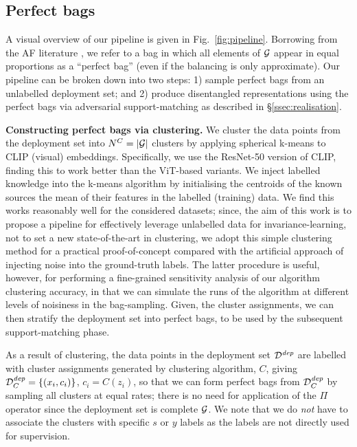 %
\subsection{Perfect bags}\label{sec:implementation}
%
A visual overview of our pipeline is given in Fig.~\ref{fig:pipeline}. 
%
Borrowing from the \ac{AF} literature \citep{chouldechova17,KleMulRag16}, we refer to a bag in
which all elements of ${\mathcal{G}}$ appear in equal proportions as a ``perfect bag'' (even if the balancing
is only approximate). 
%
Our pipeline can be broken down into two steps: 1) sample perfect bags from an unlabelled
deployment set; and 2) produce disentangled representations using the perfect bags via adversarial
support-matching as described in \S\ref{ssec:realisation}.

\textbf{Constructing perfect bags via clustering.}
%
We cluster the data points from the deployment set into \( N^C=|{\mathcal{G}}| \) clusters by applying
spherical k-means to CLIP \cite{radford2021learning} (visual) embeddings. 
%
Specifically, we use the ResNet-50 version of CLIP, finding this to work better than the ViT-based
variants. 
%
We inject labelled knowledge into the k-means algorithm by initialising the centroids of the known
sources the mean of their features in the labelled (training) data. 
%
We find this works reasonably well for the considered datasets; since, the aim of this work is to
propose a pipeline for effectively leverage unlabelled data for invariance-learning, not to set a
new state-of-the-art in clustering, we adopt this simple clustering method for a practical
proof-of-concept compared with the artificial approach of injecting noise into the ground-truth
labels. 
%
The latter procedure is useful, however, for performing a fine-grained sensitivity analysis of our
algorithm \wrt{} clustering accuracy, in that we can simulate the runs of the algorithm at
different levels of noisiness in the bag-sampling. 
%
%
Given, the cluster assignments, we can then stratify the deployment set into perfect bags, to be
used by the subsequent support-matching phase.

As a result of clustering, the data points in the deployment set \( {\mathcal{D}}^\mathit{dep} \) are
labelled with cluster assignments generated by clustering algorithm, \( C \), giving \(
{\mathcal{D}}^\mathit{dep}_C=\{(x_i, c_i)\} \), \(c_i = C(z_i) \),
%
so that we can form perfect bags from \( {\mathcal{D}}^\mathit{dep}_C \) by sampling all clusters at equal
rates; there is no need for application of the $\Pi$ operator since the deployment set is complete
\wrt{} ${\mathcal{G}}$.
%
We note that we do \emph{not} have to associate the clusters with specific $s$ or $y$ labels as the
labels are not directly used for supervision.

